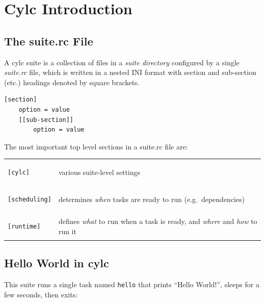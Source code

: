 \section{Cylc Introduction}
\label{Cylc Introduction}


\subsection{The suite.rc File}

A cylc suite is a collection of files in a {\em suite directory} configured by
a single {\em suite.rc} file, which is written in a nested INI format with
section and sub-section (etc.) headings denoted by square brackets.

\begin{lstlisting}[language=suiterc]
[section]
    option = value
    [[sub-section]]
        option = value
\end{lstlisting}

The most important top level sections in a suite.rc file are:

\begin{tabular}{ll}
\begin{lstlisting}
[cylc]
\end{lstlisting} & various suite-level settings\\
\begin{lstlisting}
[scheduling]
\end{lstlisting} & determines {\em when} tasks are ready to run (e.g.\ dependencies)\\
\begin{lstlisting}
[runtime]
\end{lstlisting} & defines {\em what} to run when a task is ready, and
{\em where} and {\em how} to run it \\
\end{tabular}


\subsection{Hello World in cylc}

This suite runs a single task named \lstinline{hello} that prints ``Hello
World!'', sleeps for a few seconds, then exits:


